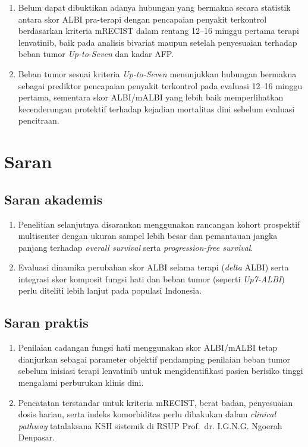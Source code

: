 \documentclass[
  indonesian,
]{report}
\begin{document}
\begin{enumerate}
\def\labelenumi{\arabic{enumi}.}
\item
  Belum dapat dibuktikan adanya hubungan yang bermakna secara statistik
  antara skor ALBI pra-terapi dengan pencapaian penyakit terkontrol
  berdasarkan kriteria mRECIST dalam rentang 12--16 minggu pertama
  terapi lenvatinib, baik pada analisis bivariat maupun setelah
  penyesuaian terhadap beban tumor \emph{Up-to-Seven} dan kadar AFP.
\item
  Beban tumor sesuai kriteria \emph{Up-to-Seven} menunjukkan hubungan
  bermakna sebagai prediktor pencapaian penyakit terkontrol pada
  evaluasi 12--16 minggu pertama, sementara skor ALBI/mALBI yang lebih
  baik memperlihatkan kecenderungan protektif terhadap kejadian
  mortalitas dini sebelum evaluasi pencitraan.
\end{enumerate}

\section{Saran}\label{saran}

\subsection{Saran akademis}\label{saran-akademis}

\begin{enumerate}
\def\labelenumi{\arabic{enumi}.}
\item
  Penelitian selanjutnya disarankan menggunakan rancangan kohort
  prospektif multisenter dengan ukuran sampel lebih besar dan pemantauan
  jangka panjang terhadap \emph{overall survival} serta
  \emph{progression-free survival}.
\item
  Evaluasi dinamika perubahan skor ALBI selama terapi (\emph{delta}
  ALBI) serta integrasi skor komposit fungsi hati dan beban tumor
  (seperti \emph{Up7-ALBI}) perlu diteliti lebih lanjut pada populasi
  Indonesia.
\end{enumerate}

\subsection{Saran praktis}\label{saran-praktis}

\begin{enumerate}
\def\labelenumi{\arabic{enumi}.}
\item
  Penilaian cadangan fungsi hati menggunakan skor ALBI/mALBI tetap
  dianjurkan sebagai parameter objektif pendamping penilaian beban tumor
  sebelum inisiasi terapi lenvatinib untuk mengidentifikasi pasien
  berisiko tinggi mengalami perburukan klinis dini.
\item
  Pencatatan terstandar untuk kriteria mRECIST, berat badan, penyesuaian
  dosis harian, serta indeks komorbiditas perlu dibakukan dalam
  \emph{clinical pathway} tatalaksana KSH sistemik di RSUP Prof.~dr.
  I.G.N.G. Ngoerah Denpasar.
\end{enumerate}
\end{document}
